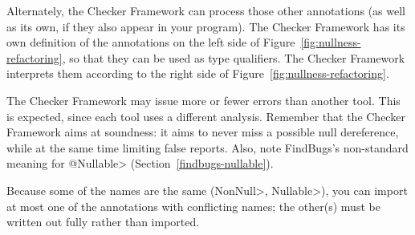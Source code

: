 

Alternately, the Checker Framework can process those other annotations (as
well as its own, if they also appear in your program).  The Checker
Framework has its own definition of the annotations on the left side of
Figure~\ref{fig:nullness-refactoring}, so that they can be used as type
qualifiers.  The Checker Framework interprets them according to the right
side of Figure~\ref{fig:nullness-refactoring}.

The Checker Framework may issue more or fewer errors than another tool.
This is expected, since each tool uses a different analysis.  Remember that
the Checker Framework aims at soundness:  it aims to never miss a possible
null dereference, while at the same time limiting false reports.  Also,
note FindBugs's non-standard meaning for \<@Nullable>
(Section~\ref{findbugs-nullable}).

Because some of the names are the same (\<NonNull>, \<Nullable>), you can
import at most one of the annotations with
conflicting names; the other(s) must be written out fully rather than
imported.


